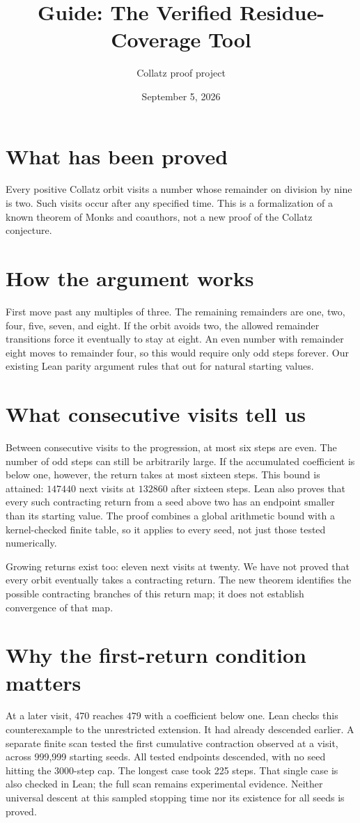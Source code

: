 \documentclass[10pt]{article}
\title{Guide: The Verified Residue-Coverage Tool}
\author{Collatz proof project}
\date{September 5, 2026}
\begin{document}
\raggedright
\maketitle
\section*{What has been proved}
Every positive Collatz orbit visits a number whose remainder on division
by nine is two. Such visits occur after any specified time. This is a
formalization of a known theorem of Monks and coauthors, not a new proof
of the Collatz conjecture.

\section*{How the argument works}
First move past any multiples of three. The remaining remainders are
one, two, four, five, seven, and eight. If the orbit avoids two, the
allowed remainder transitions force it eventually to stay at eight.
An even number with remainder eight moves to remainder four, so this
would require only odd steps forever. Our existing Lean parity argument
rules that out for natural starting values.

\section*{What consecutive visits tell us}
Between consecutive visits to the progression, at most six steps are even.
The number of odd steps can still be arbitrarily large. If the accumulated
coefficient is below one, however, the return takes at most sixteen steps.
This bound is attained: $147440$ next visits at $132860$ after sixteen steps.
Lean also proves that every such contracting return from a seed above two
has an endpoint smaller than its starting value. The proof combines a
global arithmetic bound with a kernel-checked finite table, so it applies
to every seed, not just those tested numerically.

Growing returns exist too: eleven next visits at twenty. We have not
proved that every orbit eventually takes a contracting return. The new
theorem identifies the possible contracting branches of this return map;
it does not establish convergence of that map.

\section*{Why the first-return condition matters}
At a later visit, $470$ reaches $479$ with a coefficient below one.
Lean checks this counterexample to the unrestricted extension.
It had already descended earlier. A separate finite scan tested the first
cumulative contraction observed at a visit, across 999,999 starting seeds.
All tested endpoints descended, with no seed hitting the 3000-step cap.
The longest case took 225 steps. That single case is also checked in Lean;
the full scan remains experimental evidence. Neither universal descent at
this sampled stopping time nor its existence for all seeds is proved.
\end{document}
